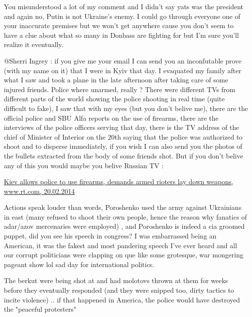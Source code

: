 \begin{itemize}
\begin{itemize}

You misunderstood a lot of my comment and I didn't say yats was the president
and again no, Putin is not Ukraine's enemy. I could go through everyone one of
your inaccurate premises but we won't get anywhere cause you don't seem to have
a clue about what so many in Donbass are fighting for but I'm sure you'll
realize it eventually.


@Sherri Ingrey : if you give me your email I can send you an inconfutable prove
(with my name on it) that I were in Kyiv that day. I evaquated my family after
what I saw and took a plane in the late afternoon after taking care of some
injured friends. Police where unarmed, really ? There were different TVs from
different parts of the world showing the police shooting in real time (quite
difficult to fake), I saw that with my eyes (but you don't belive me), there
are the official police and SBU Alfa reports on the use of firearms, there are
the interviews of the police officers serving that day, there is the TV address
of the chief of Minister of Interior on the 20th saying that the police was
authorized to shoot and to disperse immediately, if you wish I can also send
you the photos of the bullets extracted from the body of some friends shot. But
if you don't belive any of this you would maybe you belive Russian TV :

\href{https://www.rt.com/news/ukraine-kiev-firearms-weapons-police-934/}{%
Kiev allows police to use firearms, demands armed rioters lay down weapons, %
www.rt.com, 20.02.2014%
}


Actions speak louder than words, Poroshenko used the army against Ukrainians in
east (many refused to shoot their own people, hence the reason why fanatics of
adar/azov mercenaries were employed) , and Poroshenko is indeed a cia groomed
puppet, did you see his speech in congress? I was embarrassed being an
American, it was the fakest and most pandering speech I've ever heard and all
our corrupt politicians were clapping on que like some grotesque, war mongering
pageant show lol sad day for international politics.



The berkut were being shot at and had molotovs thrown at them for weeks before
they eventually responded (and they were snipped too, dirty tactics to incite
violence) .. if that happened in America, the police would have destroyed the
"peaceful protesters"


\end{itemize}
\end{itemize}
